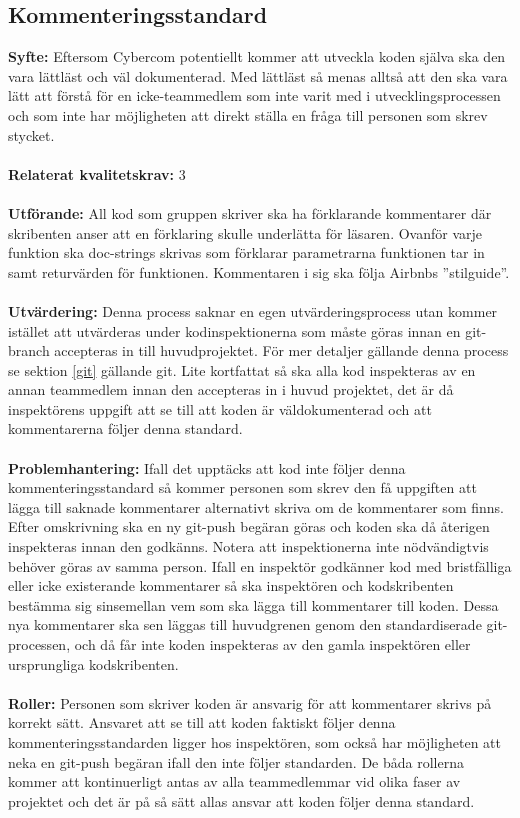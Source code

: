 \documentclass[10pt]{article}
\begin{document}
	\subsection{Kommenteringsstandard}
	\textbf{Syfte:}	Eftersom Cybercom potentiellt kommer att utveckla koden själva ska den vara lättläst och väl dokumenterad. Med lättläst så menas alltså att den ska vara lätt att förstå för en icke-teammedlem som inte varit med i utvecklingsprocessen och som inte har möjligheten att direkt ställa en fråga till personen som skrev stycket.
	\\\\
	\textbf{Relaterat kvalitetskrav:} 3 
	\\\\
	\textbf{Utförande:} All kod som gruppen skriver ska ha förklarande kommentarer där skribenten anser att en förklaring skulle underlätta för läsaren. Ovanför varje funktion ska doc-strings skrivas som förklarar parametrarna funktionen tar in samt returvärden för funktionen.
	Kommentaren i sig ska följa Airbnbs ''stilguide''\cite{bib-airbnb}.
	\\\\
	\textbf{Utvärdering:} Denna process saknar en egen utvärderingsprocess utan kommer istället att utvärderas under kodinspektionerna som måste göras innan en git-branch accepteras in till huvudprojektet\cite{bib-gitguide}. För mer detaljer gällande denna process se sektion \ref{git} gällande git.  Lite kortfattat så ska alla kod inspekteras av en annan teammedlem innan den accepteras in i huvud projektet, det är då inspektörens uppgift att se till att koden är väldokumenterad och att kommentarerna följer denna standard. 
	\\\\
	\textbf{Problemhantering:} Ifall det upptäcks att kod inte följer denna kommenteringsstandard så kommer personen som skrev den få uppgiften att lägga till saknade kommentarer alternativt skriva om de kommentarer som finns. Efter omskrivning ska en ny git-push begäran göras och koden ska då återigen inspekteras innan den godkänns. Notera att inspektionerna inte nödvändigtvis behöver göras av samma person.
	Ifall en inspektör godkänner kod med bristfälliga eller icke existerande kommentarer så ska inspektören och kodskribenten bestämma sig sinsemellan vem som ska lägga till kommentarer till koden. Dessa nya kommentarer ska sen läggas till huvudgrenen genom den standardiserade git-processen, och då får inte koden inspekteras av den gamla inspektören eller ursprungliga kodskribenten.
	\\\\
	\textbf{Roller:} Personen som skriver koden är ansvarig för att kommentarer skrivs på korrekt sätt. Ansvaret att se till att koden faktiskt följer denna kommenteringsstandarden ligger hos inspektören, som också har möjligheten att neka en git-push begäran ifall den inte följer standarden. De båda rollerna kommer att kontinuerligt antas av alla teammedlemmar vid olika faser av projektet och det är på så sätt allas ansvar att koden följer denna standard.
	\\
	
\end{document}
